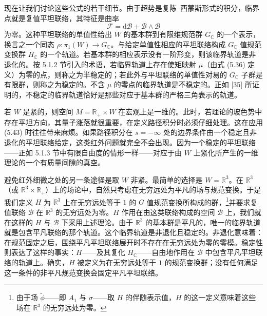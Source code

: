 \documentclass[11pt,a4paper,UTF8]{ctexart}
\theoremstyle{plain}
\theoremstyle{definition}
\begin{document}
现在让我们讨论这些公式的若干细节。由于超势是复陈–西蒙斯形式的积分，临界点就是复值平坦联络，其特征是曲率
\begin{equation}
    \mathcal{F}=\mathrm{d}\mathcal{B}+\mathcal{B}\wedge\mathcal{B}
    \tag{5.44}
\end{equation}
为零。这种平坦联络的单值性给出 $W$ 的基本群到有限维规范群 $G_{\mathbb{C}}$ 的一个表示，换言之一个同态 $\rho:\pi_1(W)\to G_{\mathbb{C}}$。与给定单值性相应的平坦联络构成 $G_{\mathbb{C}}$ 值规范变换群 $H_{\mathbb{C}}$ 的一个轨道。若基本群的相应表示没有一阶形变，则该临界轨道是非退化的。按 5.1.2 节引入的术语，若临界轨道上存在使矩映射 $\mu$（由式 (5.36) 定义）为零的点，则称之为半稳定的；若此外与平坦联络的单值性对易的 $G_{\mathbb{C}}$ 子群是有限群，则称之为稳定的。不含 $\mu$ 的零点的临界轨道是不稳定的。正如 [35] 所证明的，不稳定的临界轨道恰好是那些对应于基本群的严格三角表示的轨道。


若 $W$ 是紧的，则空间 $M=\mathbb{R}_+\times W$ 在宏观上是一维的。此时，若理论的玻色势中存在平坦方向，其量子涨落就很重要，在定义路径积分时必须仔细处理。这在应用 (5.43) 时往往带来麻烦。如果路径积分在 $s=-\infty$ 处的边界条件由一个稳定且非退化的平坦联络给定，这类红外问题就完全不会出现。因为一个稳定的平坦联络——正如 5.1.3 节中有限自由度的情形一样——对应于由 $W$ 上紧化所产生的一维理论的一个有质量间隙的真空。

避免红外细微之处的另一条途径是取 $W$ 非紧。最简单的选择是 $W=\mathbb{R}^3$。在 $\mathbb{R}^3$（或 $\mathbb{R}^3\times\mathbb{R}_+$）上的场论中，自然只考虑在无穷远处为平凡的场与规范变换。于是我们定义 $H$ 为 $\mathbb{R}^3$ 上在无穷远处等于 $1$ 的 $G$ 值规范变换所构成的群，\footnote{由于场 $\tilde\phi$——即 $A_1$ 与 $\sigma$——取 $H$ 的伴随表示值，$H$ 的这一定义意味着这些场在 $\mathbb{R}^3$ 的无穷远处为零。}并要求复值联络 $\mathcal{B}$ 在 $\mathbb{R}^3$ 的无穷远处为零。$H$ 作用在由这类联络构成的空间 $\mathcal{B}$ 上，我们就在这样的 $H$ 与 $\mathcal{B}$ 下采用上述理论。由于 $\mathbb{R}^3$ 的基本群是平凡的，唯一的临界轨道就是包含平凡联络的那个轨道。这个临界轨道是非退化且稳定的。非退化意味着：在规范固定之后，围绕平凡平坦联络展开时不存在在无穷远处为零的零模。稳定性则表达了这样的事实：$H$——及其复化 $H_{\mathbb{C}}$——自由地作用在 $\mathcal{B}$ 中包含平凡平坦联络的轨道上。确实，$H$ 被定义为在无穷远处等于 $1$ 的规范变换群；没有任何满足这一条件的非平凡规范变换会固定平凡平坦联络。
\end{document}

